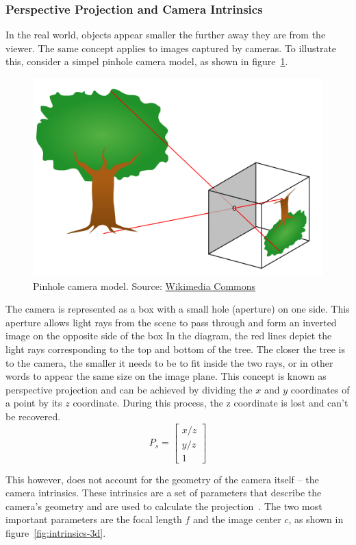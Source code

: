 \subsubsection{Perspective Projection and Camera Intrinsics}\label{sec:perspective-projection}
In the real world, objects appear smaller the further away they are from the viewer.
The same concept applies to images captured by cameras.
To illustrate this, consider a simpel pinhole camera model, as shown in figure~\ref{fig:pinhole-camera-model}.
\begin{figure}[h!]
    \centering
    \includegraphics[width=0.45\linewidth]{images/pinhole}
    \caption{Pinhole camera model. Source: \href{https://commons.wikimedia.org/wiki/File:Pinhole-camera.svg}{Wikimedia Commons}}
    \label{fig:pinhole-camera-model}
\end{figure}
The camera is represented as a box with a small hole (aperture) on one side.
This aperture allows light rays from the scene to pass through and form an inverted image on the opposite side of the box
In the diagram, the red lines depict the light rays corresponding to the top and bottom of the tree.
The closer the tree is to the camera, the smaller it needs to be to fit inside the two rays,
or in other words to appear the same size on the image plane.
This concept is known as perspective projection and can be achieved by dividing the
$x$ and $y$ coordinates of a point by its $z$ coordinate.
During this process, the z coordinate is lost and can't be recovered. \cite{szeliski_computer_2022}
\begin{equation}
    P_s = \begin{bmatrix}
              x/z \\
              y/z \\
              1
    \end{bmatrix}
\end{equation}

This however, does not account for the geometry of the camera itself -- the camera intrinsics.
These intrinsics are a set of parameters that describe the camera's geometry and are used to calculate the projection~\cite{szeliski_computer_2022}.
The two most important parameters are the focal length $f$ and the image center $c$, as shown in figure~\ref{fig:intrinsics-3d}.

